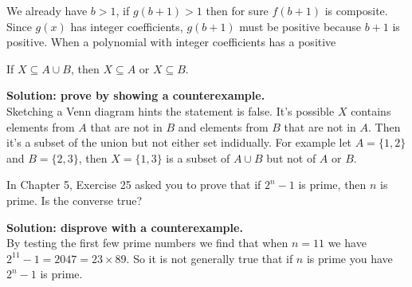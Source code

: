 \documentclass{article}
\begin{document}
We already have $b > 1$, if $g(b+1) > 1$ then for sure $f(b + 1)$ is composite. Since $g(x)$ has integer coefficients, $g(b+1)$ must be positive because $b + 1$ is positive. When a polynomial with integer coefficients has a positive

\begin{problem}
If $X \subseteq A \cup B$, then $X \subseteq A$ or $X \subseteq B$.
\end{problem}
\textbf{Solution: prove by showing a counterexample.}
\\

Sketching a Venn diagram hints the statement is false. It's possible $X$ contains elements from $A$ that are not in $B$ and elements from $B$ that are not in $A$. Then it's a subset of the union but not either set indidually. For example let $A = \{1, 2\}$ and $B = \{2, 3\}$, then $X = \{1, 3\}$ is a subset of $A \cup B$ but not of $A$ or $B$.

\begin{problem}
In Chapter 5, Exercise 25 asked you to prove that if $2^n - 1$ is prime, then $n$ is prime. Is the converse true?
\end{problem}
\textbf{Solution: disprove with a counterexample.}
\\

By testing the first few prime numbers we find that when $n = 11$ we have $2^{11} - 1 = 2047 = 23 \times 89$. So it is not generally true that if $n$ is prime you have $2^n - 1$ is prime.
\end{document}
